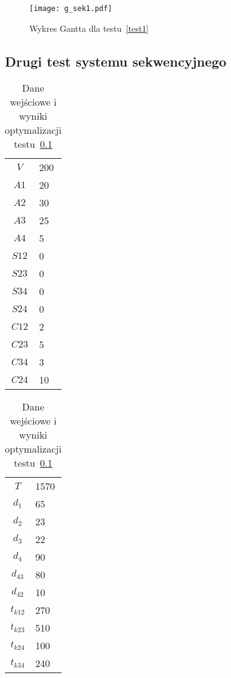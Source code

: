\begin{figure}[H]
\centering
\texttt{[image: g\_sek1.pdf]}
\caption{Wykres Gantta dla testu~\ref{test1}}
\label{fig:res_1b}
\end{figure}

\subsection{Drugi test systemu sekwencyjnego} \label{test2}

\begin{table}[H]
\begin{minipage}[b]{0.5\linewidth}
\centering
\begin{tabular}{c l}
$V$ & 200 \\
$A1$ & 20 \\
$A2$ & 30 \\
$A3$ & 25 \\
$A4$ & 5 \\
$S12$ & 0 \\
$S23$ & 0 \\
$S34$ & 0 \\
$S24$ & 0 \\
$C12$ & 2 \\
$C23$ & 5 \\
$C34$ & 3 \\
$C24$ & 10 \\
\end{tabular}
\end{minipage}
\hspace{0.5cm}
\begin{minipage}[b]{0.5\linewidth}
\centering
\begin{tabular}{c l}
$T$ & 1570 \\
$d_{1}$ & 65 \\
$d_{2}$ & 23 \\
$d_{3}$ & 22 \\
$d_{4}$ & 90 \\
$d_{43}$ & 80 \\
$d_{42}$ & 10 \\
$t_{k12}$ & 270 \\
$t_{k23}$ & 510 \\
$t_{k24}$ & 100 \\
$t_{k34}$ & 240 \\
\end{tabular}
\end{minipage}
\caption{Dane wejściowe i wyniki optymalizacji testu~\ref{test2}}
\label{tab:res_2a}
\end{table}

